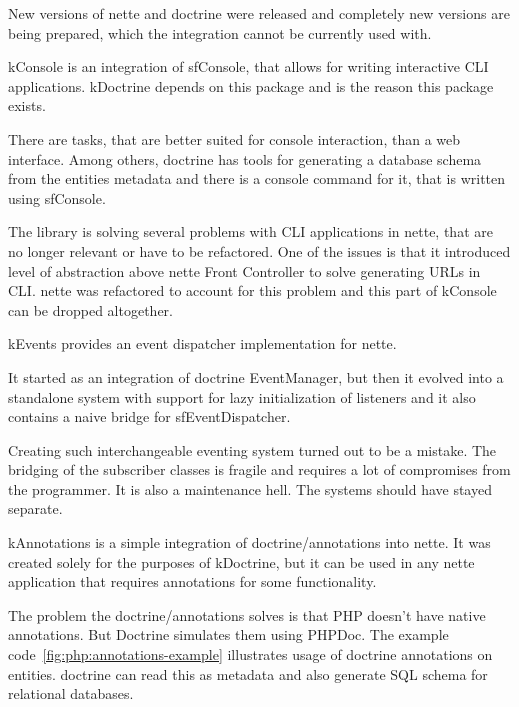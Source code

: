 New versions of \gls{nette} and \gls{doctrine} were released and completely new versions are being prepared, which the integration cannot be currently used with.

 \label{sec:state:console}

\gls{kConsole} is an integration of \gls{sfConsole}, that allows for writing interactive CLI applications. \gls{kDoctrine} depends on this package and is the reason this package exists.

There are tasks, that are better suited for console interaction, than a web interface. Among others, \gls{doctrine} has tools for generating a database schema from the entities metadata and there is a console command for it, that is written using \gls{sfConsole}.

The library is solving several problems with CLI applications in \gls{nette}, that are no longer relevant or have to be refactored. One of the issues is that it introduced level of abstraction above \gls{nette} Front Controller to solve generating URLs in CLI. \gls{nette} was refactored to account for this problem and this part of \gls{kConsole} can be dropped altogether.

 \label{sec:state:events}

\gls{kEvents} provides an event dispatcher implementation for \gls{nette}.

It started as an integration of \gls{doctrine} EventManager, but then it evolved into a standalone system with support for lazy initialization of listeners and it also contains a naive bridge for \gls{sfEventDispatcher}.

Creating such interchangeable eventing system turned out to be a mistake. The bridging of the subscriber classes is fragile and requires a lot of compromises from the programmer. It is also a maintenance hell. The systems should have stayed separate.

 \label{sec:state:annotations}

\gls{kAnnotations} is a simple integration of doctrine/annotations into \gls{nette}. It was created solely for the purposes of \gls{kDoctrine}, but it can be used in any \gls{nette} application that requires annotations for some functionality.

The problem the doctrine/annotations solves is that PHP doesn't have native annotations. But Doctrine simulates them using PHPDoc. The example code~\ref{fig:php:annotations-example} illustrates usage of \gls{doctrine} annotations on entities. \gls{doctrine} can read this as metadata and also generate SQL schema for relational databases.

